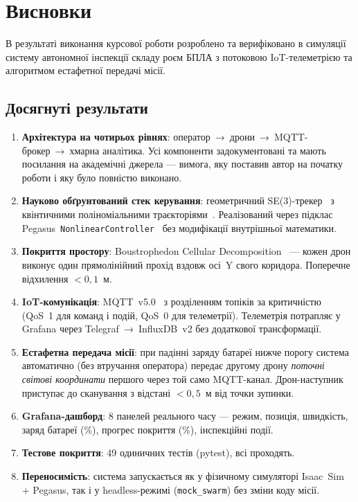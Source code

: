 \section{Висновки}\label{sec:conclusions}

В результаті виконання курсової роботи розроблено та верифіковано в симуляції систему автономної інспекції складу роєм БПЛА з потоковою IoT-телеметрією та алгоритмом естафетної передачі місії.

\subsection*{Досягнуті результати}

\begin{enumerate}[itemsep=4pt]
  \item \textbf{Архітектура на чотирьох рівнях}: оператор~→~дрони~→~MQTT-брокер~→~хмарна аналітика. Усі компоненти задокументовані та мають посилання на академічні джерела — вимога, яку поставив автор на початку роботи і яку було повністю виконано.

  \item \textbf{Науково обґрунтований стек керування}: геометричний SE(3)-трекер~\cite{Lee2010, Mellinger2011} з квінтичними поліноміальними траєкторіями~\cite{Lynch2017}. Реалізований через підклас Pegasus~\texttt{NonlinearController}~\cite{Pegasus2024} без модифікації внутрішньої математики.

  \item \textbf{Покриття простору}: Boustrophedon Cellular Decomposition~\cite{Choset2000} — кожен дрон виконує один прямолінійний прохід вздовж осі~Y свого коридора. Поперечне відхилення $< 0{,}1$~м.

  \item \textbf{IoT-комунікація}: MQTT~v5.0~\cite{MQTT5} з розділенням топіків за критичністю (QoS~1 для команд і подій, QoS~0 для телеметрії). Телеметрія потрапляє у Grafana через Telegraf~→~InfluxDB~v2 без додаткової трансформації.

  \item \textbf{Естафетна передача місії}: при падінні заряду батареї нижче порогу система автоматично (без втручання оператора) передає другому дрону \emph{поточні світові координати} першого через той само MQTT-канал. Дрон-наступник приступає до сканування з відстані $< 0{,}5$~м від точки зупинки.

  \item \textbf{Grafana-дашборд}: 8 панелей реального часу — режим, позиція, швидкість, заряд батареї (\%), прогрес покриття (\%), інспекційні події.

  \item \textbf{Тестове покриття}: 49 одиничних тестів (pytest), всі проходять.

  \item \textbf{Переносимість}: система запускається як у фізичному симуляторі Isaac~Sim + Pegasus, так і у headless-режимі (\texttt{mock\_swarm}) без зміни коду місії.
\end{enumerate}

